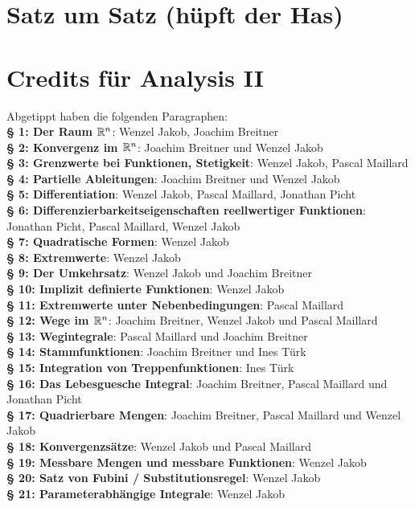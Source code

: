 \documentclass[a4paper,twoside,DIV15,BCOR12mm]{scrbook}
\begin{document}
\appendix
\chapter{Satz um Satz (hüpft der Has)}

\renewcommand{\indexname}{Stichwortverzeichnis}
\printindex

\chapter{Credits für Analysis II} Abgetippt haben die folgenden Paragraphen:\\%
\textbf{§ 1: Der Raum $\mathbb{R}^n$}: Wenzel Jakob, Joachim Breitner\\
\textbf{§ 2: Konvergenz im $\mathbb{R}^n$}: Joachim Breitner und Wenzel Jakob\\
\textbf{§ 3: Grenzwerte bei Funktionen, Stetigkeit}: Wenzel Jakob, Pascal Maillard\\
\textbf{§ 4: Partielle Ableitungen}: Joachim Breitner und Wenzel Jakob\\
\textbf{§ 5: Differentiation}: Wenzel Jakob, Pascal Maillard, Jonathan Picht\\
\textbf{§ 6: Differenzierbarkeitseigenschaften reellwertiger Funktionen}: Jonathan Picht, Pascal Maillard, Wenzel Jakob\\
\textbf{§ 7: Quadratische Formen}: Wenzel Jakob\\
\textbf{§ 8: Extremwerte}: Wenzel Jakob\\
\textbf{§ 9: Der Umkehrsatz}: Wenzel Jakob und Joachim Breitner\\
\textbf{§ 10: Implizit definierte Funktionen}: Wenzel Jakob\\
\textbf{§ 11: Extremwerte unter Nebenbedingungen}: Pascal Maillard\\
\textbf{§ 12: Wege im $\mathbb{R}^n$}: Joachim Breitner, Wenzel Jakob und Pascal Maillard\\
\textbf{§ 13: Wegintegrale}: Pascal Maillard und Joachim Breitner\\
\textbf{§ 14: Stammfunktionen}: Joachim Breitner und Ines Türk\\
\textbf{§ 15: Integration von Treppenfunktionen}: Ines Türk\\
\textbf{§ 16: Das Lebesguesche Integral}: Joachim Breitner, Pascal Maillard und Jonathan Picht\\
\textbf{§ 17: Quadrierbare Mengen}: Joachim Breitner, Pascal Maillard und Wenzel Jakob\\
\textbf{§ 18: Konvergenzsätze}: Wenzel Jakob und Pascal Maillard\\
\textbf{§ 19: Messbare Mengen und messbare Funktionen}: Wenzel Jakob\\
\textbf{§ 20: Satz von Fubini / Substitutionsregel}: Wenzel Jakob\\
\textbf{§ 21: Parameterabhängige Integrale}: Wenzel Jakob\\
\end{document}
